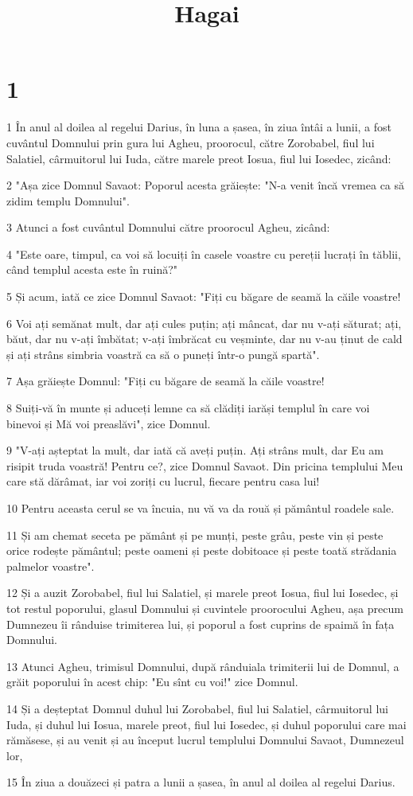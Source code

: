 

\title{Hagai}


\chapter{1}

\par 1 În anul al doilea al regelui Darius, în luna a șasea, în ziua întâi a lunii, a fost cuvântul Domnului prin gura lui Agheu, proorocul, către Zorobabel, fiul lui Salatiel, cârmuitorul lui Iuda, către marele preot Iosua, fiul lui Iosedec, zicând:
\par 2 "Așa zice Domnul Savaot: Poporul acesta grăiește: "N-a venit încă vremea ca să zidim templu Domnului".
\par 3 Atunci a fost cuvântul Domnului către proorocul Agheu, zicând:
\par 4 "Este oare, timpul, ca voi să locuiți în casele voastre cu pereții lucrați în tăblii, când templul acesta este în ruină?"
\par 5 Și acum, iată ce zice Domnul Savaot: "Fiți cu băgare de seamă la căile voastre!
\par 6 Voi ați semănat mult, dar ați cules puțin; ați mâncat, dar nu v-ați săturat; ați, băut, dar nu v-ați îmbătat; v-ați îmbrăcat cu veșminte, dar nu v-au ținut de cald și ați strâns simbria voastră ca să o puneți într-o pungă spartă".
\par 7 Așa grăiește Domnul: "Fiți cu băgare de seamă la căile voastre!
\par 8 Suiți-vă în munte și aduceți lemne ca să clădiți iarăși templul în care voi binevoi și Mă voi preaslăvi", zice Domnul.
\par 9 "V-ați așteptat la mult, dar iată că aveți puțin. Ați strâns mult, dar Eu am risipit truda voastră! Pentru ce?, zice Domnul Savaot. Din pricina templului Meu care stă dărâmat, iar voi zoriți cu lucrul, fiecare pentru casa lui!
\par 10 Pentru aceasta cerul se va încuia, nu vă va da rouă și pământul roadele sale.
\par 11 Și am chemat seceta pe pământ și pe munți, peste grâu, peste vin și peste orice rodește pământul; peste oameni și peste dobitoace și peste toată strădania palmelor voastre".
\par 12 Și a auzit Zorobabel, fiul lui Salatiel, și marele preot Iosua, fiul lui Iosedec, și tot restul poporului, glasul Domnului și cuvintele proorocului Agheu, așa precum Dumnezeu îi rânduise trimiterea lui, și poporul a fost cuprins de spaimă în fața Domnului.
\par 13 Atunci Agheu, trimisul Domnului, după rânduiala trimiterii lui de Domnul, a grăit poporului în acest chip: "Eu sînt cu voi!" zice Domnul.
\par 14 Și a deșteptat Domnul duhul lui Zorobabel, fiul lui Salatiel, cârmuitorul lui Iuda, și duhul lui Iosua, marele preot, fiul lui Iosedec, și duhul poporului care mai rămăsese, și au venit și au început lucrul templului Domnului Savaot, Dumnezeul lor,
\par 15 În ziua a douăzeci și patra a lunii a șasea, în anul al doilea al regelui Darius.

